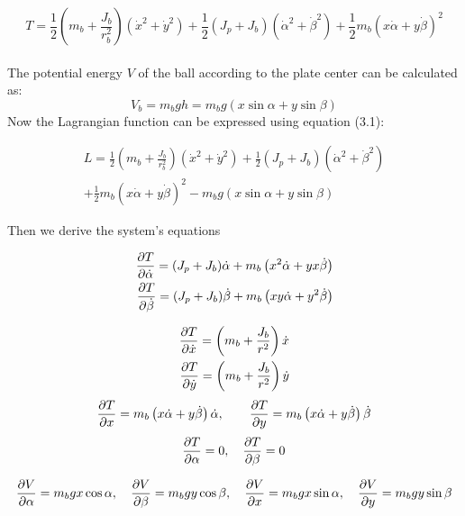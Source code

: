   \begin{equation}
          T= \frac{1}{2} \left( m_b + \frac{J_b}{r_b^2} \right)(\dot{x}^2 + \dot{y}^2 ) + \frac{1}{2} (J_p + J_b) \left(\dot{\alpha}^2 + \dot{\beta}^2 \right) + \frac{1}{2}m_b \left(  x\dot{\alpha} + y\dot{\beta} \right)^2
  \end{equation} 
  \\
 The potential energy $V$ of the ball according to the plate center can be calculated as:
\begin{equation}
V_b = m_bgh = m_bg(x\sin{\alpha} + y\sin{\beta})  
\end{equation}
Now the Lagrangian function can be expressed using equation (3.1):

    \begin{multline}
    L = \frac{1}{2} \left( m_b + \frac{J_b}{r_b^2} \right)(\dot{x}^2 + \dot{y}^2 ) + \frac{1}{2} (J_p + J_b) \left(\dot{\alpha}^2 + \dot{\beta}^2 \right) \\ + \frac{1}{2}m_b \left(  x\dot{\alpha} + y\dot{\beta} \right)^2  -m_bg(x\sin{\alpha} + y\sin{\beta})  
    \label{aaa}
    \end{multline}

Then we derive the system's equations 

\begin{align}\label{eq:lnnonspbb}
\pdv{T}{\dot{\alpha}} = (J_p + J_b) \dot{\alpha} + m_b \left(x^2\dot{\alpha} + yx\dot{\beta}\right) \\             
\pdv{T}{\dot{\beta}} = (J_p + J_b) \dot{\beta} + m_b \left(xy \dot{\alpha} + y^2\dot{\beta}\right) 
\end{align}


\begin{align}\label{eq:lnnonspbb}
 \pdv{T}{\dot{x}} = \left(m_b + \frac{J_b}{r^2}\right)\dot{x} \\
 \pdv{T}{\dot{y}} = \left(m_b + \frac{J_b}{r^2}\right)\dot{y} 
\end{align}
\begin{align}
\pdv{T}{x} = m_b \left( x\dot{\alpha} + y\dot{\beta} \right)\dot{\alpha} , \qquad 
\pdv{T}{y} = m_b \left( x\dot{\alpha} + y\dot{\beta} \right)\dot{\beta} 
\end{align}
\begin{align}\label{eq:aa3}
 \pdv{T}{\alpha} = 0 ,\quad 
  \pdv{T}{\beta} = 0
\end{align}

\begin{align}\label{eq:lnnonspbb}
 \pdv{V}{\alpha} = m_bgx\cos{\alpha} ,\quad 
 \pdv{V}{\beta} = m_bgy\cos{\beta} ,\quad 
\pdv{V}{x} = m_bgx\sin{\alpha} ,\quad 
 \pdv{V}{y} = m_bgy\sin{\beta} 
\end{align}


